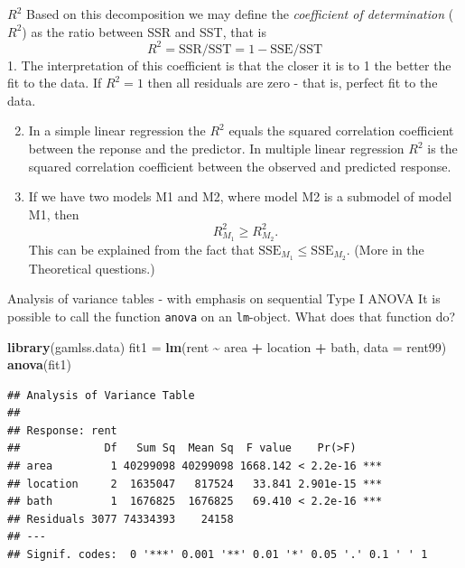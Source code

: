 \documentclass[
  ignorenonframetext,
]{beamer}
\newenvironment{Shaded}{\begin{snugshade}}{\end{snugshade}}
\newcommand{\AttributeTok}[1]{\textcolor[rgb]{0.13,0.29,0.53}{#1}}
\newcommand{\FunctionTok}[1]{\textcolor[rgb]{0.13,0.29,0.53}{\textbf{#1}}}
\newcommand{\NormalTok}[1]{#1}
\newcommand{\OtherTok}[1]{\textcolor[rgb]{0.56,0.35,0.01}{#1}}
\newcommand{\SpecialCharTok}[1]{\textcolor[rgb]{0.81,0.36,0.00}{\textbf{#1}}}
\begin{document}
\begin{frame}{\(R^2\)}
\label{r2}
Based on this decomposition we may define the \emph{coefficient of
determination} (\(R^2\)) as the ratio between SSR and SST, that is
\[R^2=\text{SSR}/\text{SST}=1-\text{SSE}/\text{SST}\] 1. The
interpretation of this coefficient is that the closer it is to 1 the
better the fit to the data. If \(R^2=1\) then all residuals are zero -
that is, perfect fit to the data.

\begin{enumerate}
\setcounter{enumi}{1}
\item
  In a simple linear regression the \(R^2\) equals the squared
  correlation coefficient between the reponse and the predictor. In
  multiple linear regression \(R^2\) is the squared correlation
  coefficient between the observed and predicted response.
\item
  If we have two models M1 and M2, where model M2 is a submodel of model
  M1, then \[ R^2_{M_1}\ge R^2_{M_2}.\] This can be explained from the
  fact that \(\text{SSE}_{M_1}\le \text{SSE}_{M_2}\). (More in the
  Theoretical questions.)
\end{enumerate}
\end{frame}

\begin{frame}[fragile]{Analysis of variance tables - with emphasis on
sequential Type I ANOVA}
\label{analysis-of-variance-tables---with-emphasis-on-sequential-type-i-anova}
It is possible to call the function \texttt{anova} on an
\texttt{lm}-object. What does that function do?

\begin{Shaded}
\begin{Highlighting}[]
\FunctionTok{library}\NormalTok{(gamlss.data)}
\NormalTok{fit1 }\OtherTok{=} \FunctionTok{lm}\NormalTok{(rent }\SpecialCharTok{\textasciitilde{}}\NormalTok{ area }\SpecialCharTok{+}\NormalTok{ location }\SpecialCharTok{+}\NormalTok{ bath, }\AttributeTok{data =}\NormalTok{ rent99)}
\FunctionTok{anova}\NormalTok{(fit1)}
\end{Highlighting}
\end{Shaded}

\begin{verbatim}
## Analysis of Variance Table
## 
## Response: rent
##             Df   Sum Sq  Mean Sq  F value    Pr(>F)    
## area         1 40299098 40299098 1668.142 < 2.2e-16 ***
## location     2  1635047   817524   33.841 2.901e-15 ***
## bath         1  1676825  1676825   69.410 < 2.2e-16 ***
## Residuals 3077 74334393    24158                       
## ---
## Signif. codes:  0 '***' 0.001 '**' 0.01 '*' 0.05 '.' 0.1 ' ' 1
\end{verbatim}
\end{frame}
\end{document}
